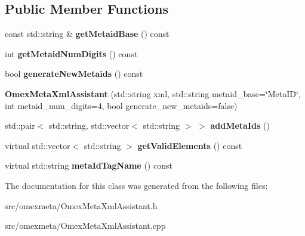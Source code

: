 \subsection*{Public Member Functions}
\begin{DoxyCompactItemize}
\item 
\mbox{\label{classomexmeta_1_1OmexMetaXmlAssistant_a69bb3ac99f1585b6f567b80e88f52642}} 
const std\+::string \& {\bfseries get\+Metaid\+Base} () const
\item 
\mbox{\label{classomexmeta_1_1OmexMetaXmlAssistant_a4c9759afd4af42595a4f0a4feb913524}} 
int {\bfseries get\+Metaid\+Num\+Digits} () const
\item 
\mbox{\label{classomexmeta_1_1OmexMetaXmlAssistant_a9ff89057f4fe7e8cb2e25f5431bf2bb5}} 
bool {\bfseries generate\+New\+Metaids} () const
\item 
\mbox{\label{classomexmeta_1_1OmexMetaXmlAssistant_af619a65dd28d04dfabd1930ff4110ce0}} 
{\bfseries Omex\+Meta\+Xml\+Assistant} (std\+::string xml, std\+::string metaid\+\_\+base=\char`\"{}Meta\+ID\char`\"{}, int metaid\+\_\+num\+\_\+digits=4, bool generate\+\_\+new\+\_\+metaids=false)
\item 
\mbox{\label{classomexmeta_1_1OmexMetaXmlAssistant_aeef7e70a554aaf70fb694297e37e7cc8}} 
std\+::pair$<$ std\+::string, std\+::vector$<$ std\+::string $>$ $>$ {\bfseries add\+Meta\+Ids} ()
\item 
\mbox{\label{classomexmeta_1_1OmexMetaXmlAssistant_a3a6631e92df490f87f469abca81e1ba1}} 
virtual std\+::vector$<$ std\+::string $>$ {\bfseries get\+Valid\+Elements} () const
\item 
\mbox{\label{classomexmeta_1_1OmexMetaXmlAssistant_adbfc8d96f2adffa35ee01726a97dbcce}} 
virtual std\+::string {\bfseries meta\+Id\+Tag\+Name} () const
\end{DoxyCompactItemize}


The documentation for this class was generated from the following files\+:\begin{DoxyCompactItemize}
\item 
src/omexmeta/Omex\+Meta\+Xml\+Assistant.\+h\item 
src/omexmeta/Omex\+Meta\+Xml\+Assistant.\+cpp\end{DoxyCompactItemize}
